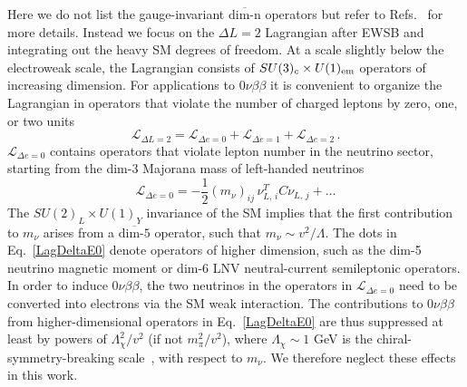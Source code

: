 \documentclass[letterpaper,11pt]{article}
\newcommand{\textoverline}[1]{$\overline{\mbox{#1}}$}
\begin{document}
Here we do not list the gauge-invariant \textoverline{dim-n} operators but  refer to Refs.~\cite{Weinberg:1979sa,Babu:2001ex,Prezeau:2003xn,deGouvea:2007qla,Lehman:2014jma,Graesser:2016bpz,Cirigliano:2017djv} for more details. Instead we focus on the $\Delta L = 2$ Lagrangian after EWSB and integrating out the heavy SM degrees of freedom. At a scale slightly below the electroweak scale, the Lagrangian consists of $SU(3)_c \times  U(1)_{\rm em}$ operators of increasing dimension.
For applications to $0\nu\beta\beta$ it is convenient to organize the Lagrangian in operators that violate the number of charged leptons by zero, one, or two units
\begin{equation}\label{LagDeltaL2}
\mathcal L_{\Delta L = 2} = \mathcal L_{\Delta e = 0} +  \mathcal L_{\Delta e = 1} + \mathcal L_{\Delta e = 2}\,.  
\end{equation}
$\mathcal L_{\Delta e = 0}$ contains operators that violate lepton number in the neutrino sector, starting from the dim-3 Majorana mass of left-handed neutrinos
\begin{equation}\label{LagDeltaE0}
\mathcal L_{\Delta e = 0}   = - \frac{1}{2} (m_{\nu})_{ij} \, \nu^{T}_{L,\, i} C \nu_{L,\, j}  + \ldots
\end{equation}
The $SU(2)_L \times U(1)_Y$ invariance of the SM implies that the first contribution to $m_\nu$ arises from a \textoverline{dim-5} operator, such that $m_\nu \sim v^2/\Lambda$. 
The dots in Eq.\ \eqref{LagDeltaE0} denote operators of higher dimension, such as the dim-5 neutrino magnetic moment or dim-6 LNV neutral-current semileptonic operators. 
In order to induce $0\nu\beta\beta$, the two neutrinos in the operators in $\mathcal L_{\Delta e = 0}$ need to be converted into electrons via the SM weak interaction. 
The contributions to $0\nu\beta\beta$ from higher-dimensional operators in Eq.\ \eqref{LagDeltaE0} are thus  
suppressed 
at least 
by powers of
 $\Lambda_\chi^2 / v^2$
(if not  $m_\pi^2 / v^2$), 
 where $\Lambda_\chi \sim 1$ GeV is the 
chiral-symmetry-breaking scale~\cite{Manohar:1983md}, with respect to $m_\nu$.  
We therefore neglect these effects in this work.
\end{document}
